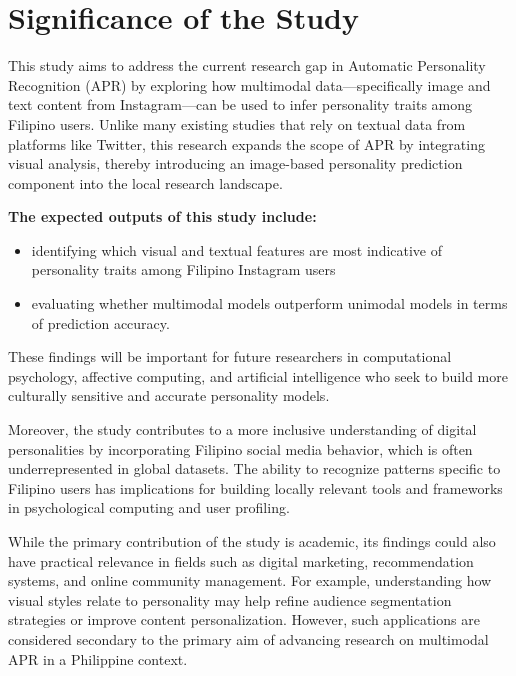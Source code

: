 
\section{Significance of the Study}
\label{sec: Significance}

This study aims to address the current research gap in Automatic Personality Recognition (APR) by exploring how multimodal data—specifically image and text content from Instagram—can be used to infer personality traits among Filipino users. Unlike many existing studies that rely on textual data from platforms like Twitter, this research expands the scope of APR by integrating visual analysis, thereby introducing an image-based personality prediction component into the local research landscape.

\textbf{The expected outputs of this study include:} 
\begin{itemize}
\item identifying which visual and textual features are most indicative of personality traits among Filipino Instagram users 
\item evaluating whether multimodal models outperform unimodal models in terms of prediction accuracy.
\end{itemize} 
These findings will be important for future researchers in computational psychology, affective computing, and artificial intelligence who seek to build more culturally sensitive and accurate personality models.

Moreover, the study contributes to a more inclusive understanding of digital personalities by incorporating Filipino social media behavior, which is often underrepresented in global datasets. The ability to recognize patterns specific to Filipino users has implications for building locally relevant tools and frameworks in psychological computing and user profiling.

While the primary contribution of the study is academic, its findings could also have practical relevance in fields such as digital marketing, recommendation systems, and online community management. For example, understanding how visual styles relate to personality may help refine audience segmentation strategies or improve content personalization. However, such applications are considered secondary to the primary aim of advancing research on multimodal APR in a Philippine context.


